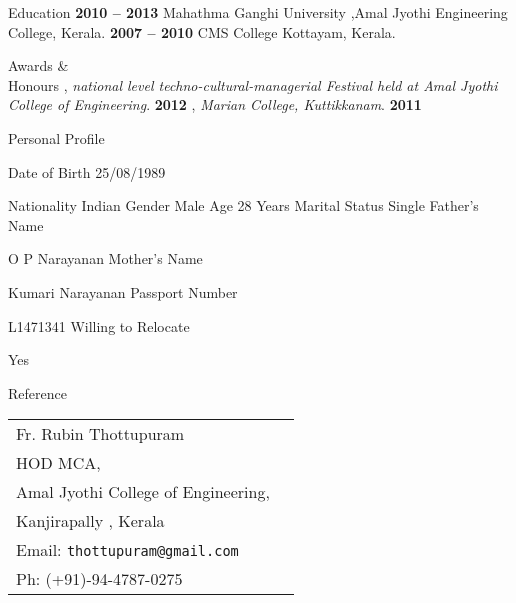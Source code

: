\documentclass{resume}
\begin{document}

\begin{category}{Education}
   \hfill \textbf{2010 -- 2013}
  \citemnobullet Mahathma Ganghi University ,Amal Jyothi Engineering College, Kerala.
   \hfill \textbf{2007 -- 2010}
  \citemnobullet CMS College Kottayam, Kerala.
\end{category}



\begin{category}{Awards \&\\ Honours}
  , {\em national level techno-cultural-managerial Festival held at Amal Jyothi College of Engineering}. \hfill \textbf{2012}
  , {\em Marian College, Kuttikkanam}. \hfill \textbf{2011}
  
\end{category}

\begin{category}{Personal Profile}
 
 
Date of Birth 25/08/1989



Nationality  Indian
Gender  Male
Age 28 Years
Marital Status Single
Father’s Name


O P Narayanan
Mother’s Name


Kumari Narayanan
Passport Number


L1471341
Willing to Relocate


Yes

  
\end{category}



\begin{category}{Reference}
  \citemnobullet \\
  \begin{tabular}{ll}Fr. Rubin Thottupuram\\
    HOD MCA, \\
    Amal Jyothi College of Engineering,\\
    Kanjirapally , Kerala\\
    Email: \mbox{\small\tt thottupuram@gmail.com}\\
    Ph: (+91)-94-4787-0275
  \end{tabular}
\end{category}
\end{document}
